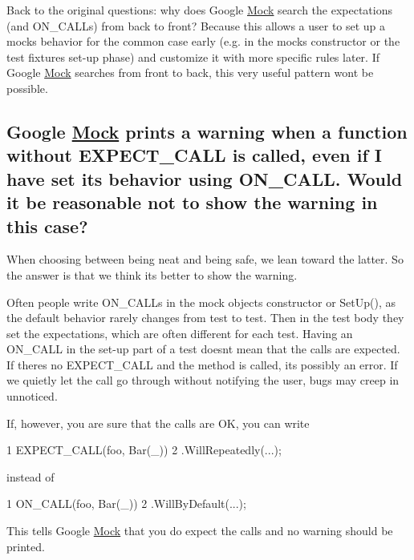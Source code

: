 Back to the original questions\+: why does Google \hyperlink{class_mock}{Mock} search the expectations (and {\ttfamily O\+N\+\_\+\+C\+A\+LL}s) from back to front? Because this allows a user to set up a mock\textquotesingle{}s behavior for the common case early (e.\+g. in the mock\textquotesingle{}s constructor or the test fixture\textquotesingle{}s set-\/up phase) and customize it with more specific rules later. If Google \hyperlink{class_mock}{Mock} searches from front to back, this very useful pattern won\textquotesingle{}t be possible.

\subsection*{Google \hyperlink{class_mock}{Mock} prints a warning when a function without E\+X\+P\+E\+C\+T\+\_\+\+C\+A\+LL is called, even if I have set its behavior using O\+N\+\_\+\+C\+A\+LL. Would it be reasonable not to show the warning in this case?}

When choosing between being neat and being safe, we lean toward the latter. So the answer is that we think it\textquotesingle{}s better to show the warning.

Often people write {\ttfamily O\+N\+\_\+\+C\+A\+LL}s in the mock object\textquotesingle{}s constructor or {\ttfamily Set\+Up()}, as the default behavior rarely changes from test to test. Then in the test body they set the expectations, which are often different for each test. Having an {\ttfamily O\+N\+\_\+\+C\+A\+LL} in the set-\/up part of a test doesn\textquotesingle{}t mean that the calls are expected. If there\textquotesingle{}s no {\ttfamily E\+X\+P\+E\+C\+T\+\_\+\+C\+A\+LL} and the method is called, it\textquotesingle{}s possibly an error. If we quietly let the call go through without notifying the user, bugs may creep in unnoticed.

If, however, you are sure that the calls are OK, you can write


\begin{DoxyCode}
1 EXPECT\_CALL(foo, Bar(\_))
2     .WillRepeatedly(...);
\end{DoxyCode}


instead of


\begin{DoxyCode}
1 ON\_CALL(foo, Bar(\_))
2     .WillByDefault(...);
\end{DoxyCode}


This tells Google \hyperlink{class_mock}{Mock} that you do expect the calls and no warning should be printed.

